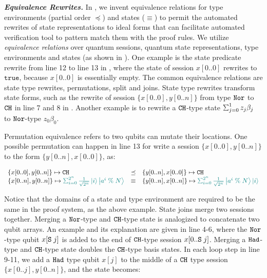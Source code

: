\noindent\textbf{\textit{Equivalence Rewrites.}}\label{sec:conditionals}
In \qafny, we invent equivalence relations for type environments (partial order $\preceq$) and states ($\equiv$) to permit the automated rewrites of state representations to ideal forms that can facilitate automated verification tool to pattern match them with the proof rules.
We utilize \emph{equivalence relations} over quantum sessions, quantum state representations, type environments and states (as shown in ). One example is the state predicate rewrite from line 12 to line 13 in , where the state of session $x[0..0]$ rewrites to $\texttt{true}$, because $x[0..0]$ is essentially empty.
The common equivalence relations are state type rewrites, permutations, split and joins. 
State type rewrites transform state forms, such as the rewrite of session $\{x[0..0],y[0..n]\}$ from type $\texttt{Nor}$ to $\texttt{CH}$ in line 7 and 8 in . Another example is to rewrite a $\texttt{CH}$-type state $\ssum{j=0}{1}{z_j\beta_j}$ to $\texttt{Nor}$-type ${z_0\beta_0}$.

Permutation equivalence refers to two qubits can mutate their locations. One possible permutation can happen in line 13 for write a session $\{x[0..0],y[0..n]\}$ to the form $\{y[0..n],x[0..0]\}$, as:

{\footnotesize
\begin{center}
$\begin{array}{lcl}
\{x[0..0],y[0..n]\}\mapsto \tcht &\preceq& \{y[0..n],x[0..0]\}\mapsto \tcht 
\\
\{x[0..n],y[0..n]\} \mapsto \textcolor{teal}{\schai{2^{n}}{\frac{1}{\sqrt{2^{n}}}}{i}{\ket{a^{i}\;\%\;N}}} &\equiv& \{y[0..n],x[0..n]\} \mapsto \textcolor{teal}{\schai{2^{n}}{\frac{1}{\sqrt{2^{n}}}}{a^{i}\;\%\;N}{\ket{i}}}
\end{array}
$
\end{center}
}

Notice that the domains of a state and type environment are required to be the same in the \qafny proof system, as the above example.
State joins merge two sessions together. Merging a $\texttt{Nor}$-type and $\texttt{CH}$-type state is analogized to concatenate two qubit arrays.
An example and its explanation are given in  line 4-6, 
where the $\texttt{Nor}$-type qubit $x[\texttt{S}\;j]$ is added to the end of $\texttt{CH}$-type session $x[0..\texttt{S}\;j]$.
Merging a $\texttt{Had}$-type and $\texttt{CH}$-type state doubles the $\texttt{CH}$-type basis states. 
In each loop step in  line 9-11, we add a $\texttt{Had}$ type qubit $x[j]$ to the middle of a $\texttt{CH}$ type session $\{x[0..j],y[0..n]\}$, and the state becomes:

